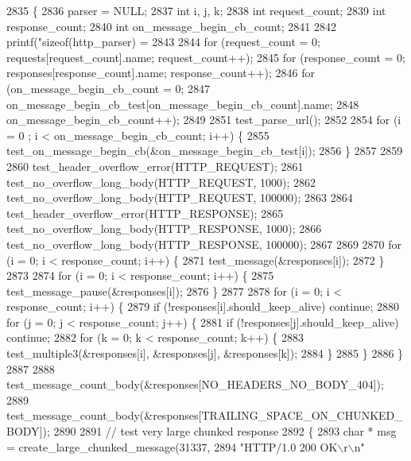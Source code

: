 \begin{DoxyCode}
2835 \{
2836   parser = NULL;
2837   \textcolor{keywordtype}{int} i, j, k;
2838   \textcolor{keywordtype}{int} request\_count;
2839   \textcolor{keywordtype}{int} response\_count;
2840   \textcolor{keywordtype}{int} on\_message\_begin\_cb\_count;
2841 
2842   printf(\textcolor{stringliteral}{"sizeof(http\_parser) = %
2843 
2844   \textcolor{keywordflow}{for} (request\_count = 0; requests[request\_count].name; request\_count++);
2845   \textcolor{keywordflow}{for} (response\_count = 0; responses[response\_count].name; response\_count++);
2846   \textcolor{keywordflow}{for} (on\_message\_begin\_cb\_count = 0;
2847        on_message_begin_cb_test[on\_message\_begin\_cb\_count].name;
2848        on\_message\_begin\_cb\_count++);
2849 
2851   test_parse_url();
2852 
2854   \textcolor{keywordflow}{for} (i = 0 ; i < on\_message\_begin\_cb\_count; i++) \{
2855     test_on_message_begin_cb(&on_message_begin_cb_test[i]);
2856   \}
2857 
2859 
2860   test_header_overflow_error(HTTP_REQUEST);
2861   test_no_overflow_long_body(HTTP_REQUEST, 1000);
2862   test_no_overflow_long_body(HTTP_REQUEST, 100000);
2863 
2864   test_header_overflow_error(HTTP_RESPONSE);
2865   test_no_overflow_long_body(HTTP_RESPONSE, 1000);
2866   test_no_overflow_long_body(HTTP_RESPONSE, 100000);
2867 
2869 
2870   \textcolor{keywordflow}{for} (i = 0; i < response\_count; i++) \{
2871     test_message(&responses[i]);
2872   \}
2873 
2874   \textcolor{keywordflow}{for} (i = 0; i < response\_count; i++) \{
2875     test_message_pause(&responses[i]);
2876   \}
2877 
2878   \textcolor{keywordflow}{for} (i = 0; i < response\_count; i++) \{
2879     \textcolor{keywordflow}{if} (!responses[i].should_keep_alive) \textcolor{keywordflow}{continue};
2880     \textcolor{keywordflow}{for} (j = 0; j < response\_count; j++) \{
2881       \textcolor{keywordflow}{if} (!responses[j].should\_keep\_alive) \textcolor{keywordflow}{continue};
2882       \textcolor{keywordflow}{for} (k = 0; k < response\_count; k++) \{
2883         test_multiple3(&responses[i], &responses[j], &responses[k]);
2884       \}
2885     \}
2886   \}
2887 
2888   test_message_count_body(&responses[NO_HEADERS_NO_BODY_404]);
2889   test_message_count_body(&responses[TRAILING_SPACE_ON_CHUNKED_BODY]);
2890 
2891   \textcolor{comment}{// test very large chunked response}
2892   \{
2893     \textcolor{keywordtype}{char} * msg = create_large_chunked_message(31337,
2894       \textcolor{stringliteral}{"HTTP/1.0 200 OK\(\backslash\)r\(\backslash\)n"}
}
\end{DoxyCode}
